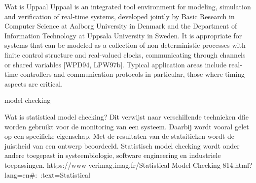 Wat is Uppaal
Uppaal is an integrated tool environment for modeling, simulation and verification of real-time systems, developed jointly by Basic Research in Computer Science at Aalborg University in Denmark and the Department of Information Technology at Uppsala University in Sweden. It is appropriate for systems that can be modeled as a collection of non-deterministic processes with finite control structure and real-valued clocks, communicating through channels or shared variables [WPD94, LPW97b]. Typical application areas include real-time controllers and communication protocols in particular, those where timing aspects are critical.


model checking

Wat is statistical model checking?
Dit verwijst naar verschillende technieken dfie worden gebruikt voor de monitoring van een systeem. Daarbij wordt vooral gelet op een specifieke eigenschap. Met de resultaten van de statsitieken wordt de juistheid van een ontwerp beoordeeld. Statistisch model checking wordt onder andere toegepast in systeembiologie, software engineering en industriele toepassingen.
https://www-verimag.imag.fr/Statistical-Model-Checking-814.html?lang=en#:~:text=Statistical%

